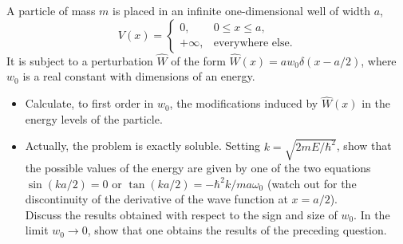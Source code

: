 \documentclass[10pt,a4paper]{article}
\newenvironment{problem}[2][Problem]{\begin{trivlist}
\item[\hskip \labelsep {\bfseries #1}\hskip \labelsep {\bfseries #2.}]}{\end{trivlist}}
\begin{document}
\begin{problem}{1}
[C-T Exercise 11-1] A particle of mass $m$ is placed in an infinite one-dimensional well of width $a$,
\[
V(x)=\left\{\begin{array}{ll}
0,&0\leq x\leq a,\\
+\infty,&\text{everywhere else.}
\end{array}\right.
\]
It is subject to a perturbation $\hat{W}$ of the form $\hat{W}(x)=aw_0\delta(x-a/2)$, where $w_0$ is a real constant with dimensions of an energy.
\begin{itemize}
\item[(a)] Calculate, to first order in $w_0$, the modifications induced by $\hat{W}(x)$ in the energy levels of the particle.
\item[(b)] Actually, the problem is exactly soluble. Setting $k=\sqrt{2mE/\hbar^2}$, show that the possible values of the energy are given by one of the two equations $\sin(ka/2)=0$ or $\tan(ka/2)=-\hbar^2k/ma\omega_0$ (watch out for the discontinuity of the derivative of the wave function at $x=a/2$).\\
Discuss the results obtained with respect to the sign and size of $w_0$. In the limit $w_0\rightarrow0$, show that one obtains the results of the preceding question.
\end{itemize}
\end{problem}
\end{document}
